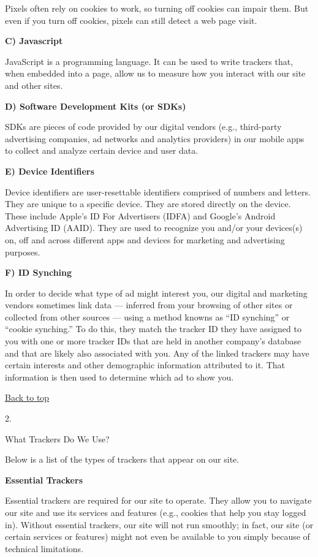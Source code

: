 Pixels often rely on cookies to work, so turning off cookies can impair
them. But even if you turn off cookies, pixels can still detect a web
page visit.

\textbf{C) Javascript}

JavaScript is a programming language. It can be used to write trackers
that, when embedded into a page, allow us to measure how you interact
with our site and other sites.

\textbf{D) Software Development Kits (or SDKs)}

SDKs are pieces of code provided by our digital vendors (e.g.,
third-party advertising companies, ad networks and analytics providers)
in our mobile apps to collect and analyze certain device and user data.

\textbf{E) Device Identifiers}

Device identifiers are user-resettable identifiers comprised of numbers
and letters. They are unique to a specific device. They are stored
directly on the device. These include Apple's ID For Advertisers (IDFA)
and Google's Android Advertising ID (AAID). They are used to recognize
you and/or your devices(s) on, off and across different apps and devices
for marketing and advertising purposes.

\textbf{F) ID Synching}

In order to decide what type of ad might interest you, our digital and
marketing vendors sometimes link data --- inferred from your browsing of
other sites or collected from other sources --- using a method knowns as
``ID synching'' or ``cookie synching.'' To do this, they match the
tracker ID they have assigned to you with one or more tracker IDs that
are held in another company's database and that are likely also
associated with you. Any of the linked trackers may have certain
interests and other demographic information attributed to it. That
information is then used to determine which ad to show you.

\href{app}{Back to top}

2.

What Trackers Do We Use?

Below is a list of the types of trackers that appear on our site.

\textbf{Essential Trackers}

Essential trackers are required for our site to operate. They allow you
to navigate our site and use its services and features (e.g., cookies
that help you stay logged in). Without essential trackers, our site will
not run smoothly; in fact, our site (or certain services or features)
might not even be available to you simply because of technical
limitations.

